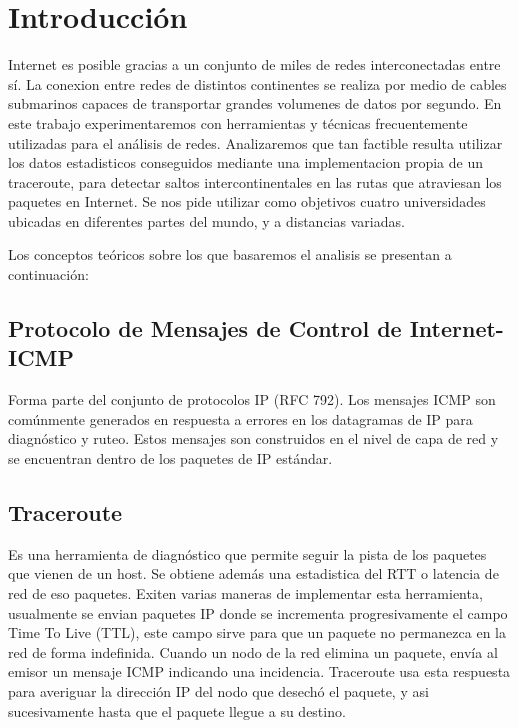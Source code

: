 \section{Introducción}

Internet es posible gracias a un conjunto de miles de redes interconectadas entre sí.
La conexion entre redes de distintos continentes se realiza por medio de cables submarinos capaces de transportar grandes volumenes de datos por segundo.
En este trabajo experimentaremos con herramientas y técnicas frecuentemente utilizadas para el análisis de redes.
Analizaremos que tan factible resulta utilizar los datos estadisticos conseguidos mediante una implementacion propia de un traceroute, para detectar saltos intercontinentales en las rutas que atraviesan los paquetes en Internet.  
Se nos pide utilizar como objetivos cuatro universidades ubicadas en diferentes partes del mundo, y a distancias variadas.

Los conceptos teóricos sobre los que basaremos el analisis se presentan a continuación: 

\subsection{Protocolo de Mensajes de Control de Internet- ICMP}

Forma parte del conjunto de protocolos IP (RFC 792). Los mensajes ICMP son comúnmente generados en respuesta a errores en los datagramas de IP para diagnóstico y ruteo. Estos mensajes son construidos en el nivel de capa de red y se encuentran dentro de los paquetes de IP estándar.

\subsection{Traceroute}

Es una herramienta de diagnóstico que permite seguir la pista de los paquetes que vienen de un host. Se obtiene además una estadistica del RTT o latencia de red de eso paquetes.
Exiten varias maneras de implementar esta herramienta, usualmente se envian paquetes IP donde se incrementa progresivamente el campo Time To Live (TTL), este campo sirve para que un paquete no permanezca en la red de forma indefinida. Cuando un nodo de la red elimina un paquete, envía al emisor un mensaje ICMP indicando una incidencia. Traceroute usa esta respuesta para averiguar la dirección IP del nodo que desechó el paquete, y asi sucesivamente hasta que el paquete llegue a su destino.

